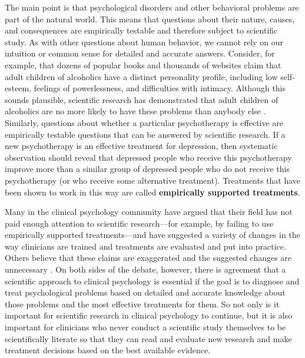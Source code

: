 The main point is that psychological disorders and other behavioral problems are part of the natural world. This means that questions about their nature, causes, and consequences are empirically testable and therefore subject to scientific study. As with other questions about human behavior, we cannot rely on our intuition or common sense for detailed and accurate answers. Consider, for example, that dozens of popular books and thousands of websites claim that adult children of alcoholics have a distinct personality profile, including low self-esteem, feelings of powerlessness, and difficulties with intimacy. Although this sounds plausible, scientific research has demonstrated that adult children of alcoholics are no more likely to have these problems than anybody else \citep{lilienfeld_50_2011}. Similarly, questions about whether a particular psychotherapy is effective are empirically testable questions that can be answered by scientific research. If a new psychotherapy is an effective treatment for depression, then systematic observation should reveal that depressed people who receive this psychotherapy improve more than a similar group of depressed people who do not receive this psychotherapy (or who receive some alternative treatment). Treatments that have been shown to work in this way are called \textbf{empirically supported treatments}.

Many in the clinical psychology community have argued that their field has not paid enough attention to scientific research---for example, by failing to use empirically supported treatments---and have suggested a variety of changes in the way clinicians are trained and treatments are evaluated and put into practice. Others believe that these claims are exaggerated and the suggested changes are unnecessary \citep{norcross_evidence-based_2006}. On both sides of the debate, however, there is agreement that a scientific approach to clinical psychology is essential if the goal is to diagnose and treat psychological problems based on detailed and accurate knowledge about those problems and the most effective treatments for them. So not only is it important for scientific research in clinical psychology to continue, but it is also important for clinicians who never conduct a scientific study themselves to be scientifically literate so that they can read and evaluate new research and make treatment decisions based on the best available evidence.

